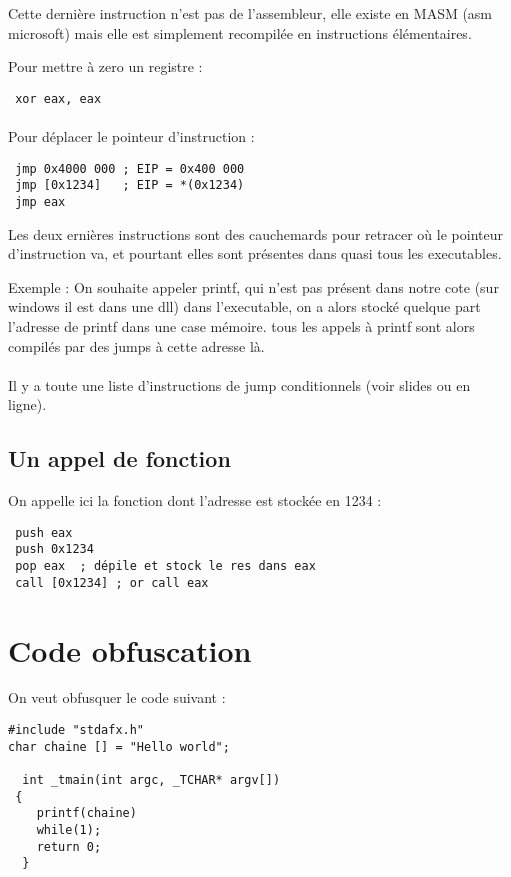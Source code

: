 \documentclass[a4paper,10pt]{article}
\begin{document}
Cette dernière instruction n'est pas de l'assembleur, elle existe en MASM (asm microsoft) mais elle est simplement recompilée en  instructions élémentaires.

Pour mettre à zero un registre :
\begin{lstlisting}
 xor eax, eax
\end{lstlisting}

\paragraph*{}
Pour déplacer le pointeur d'instruction :
\begin{lstlisting}
 jmp 0x4000 000 ; EIP = 0x400 000
 jmp [0x1234]   ; EIP = *(0x1234)
 jmp eax
\end{lstlisting}

Les deux ernières instructions sont des cauchemards pour retracer où le pointeur d'instruction va, et pourtant elles sont présentes dans quasi tous les executables.

Exemple : 
On souhaite appeler printf, qui n'est pas présent dans notre cote (sur windows il est dans une dll) dans l'executable, on a alors stocké quelque part l'adresse de printf dans une case mémoire. tous les appels à printf sont alors compilés par des jumps à cette adresse là.

\paragraph*{}
Il y a toute une liste d'instructions de jump conditionnels (voir slides ou en ligne). 

\subsection{Un appel de fonction}

On appelle ici la fonction dont l'adresse est stockée en 1234 : 
\begin{lstlisting}
 push eax
 push 0x1234
 pop eax  ; dépile et stock le res dans eax
 call [0x1234] ; or call eax
\end{lstlisting}

\section{Code obfuscation}

On veut obfusquer le code suivant : 

\begin{lstlisting}
#include "stdafx.h"
char chaine [] = "Hello world";

  int _tmain(int argc, _TCHAR* argv[])
 {
    printf(chaine)
    while(1);
    return 0;
  }
 
\end{lstlisting}
\end{document}
